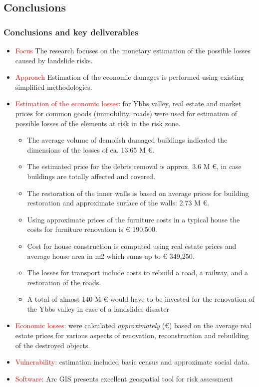 \documentclass[pdflatex,compress,9pt,
	xcolor={dvipsnames,dvipsnames,svgnames,x11names,table},
	hyperref={colorlinks = true,breaklinks = true, urlcolor = NavyBlue, breaklinks = true}]{beamer}
\begin{document}
\subsection{Conclusions}
\begin{frame}\frametitle{Conclusions and key deliverables}
\begin{itemize}
\footnotesize
	   \item \textcolor{red}{Focus} The research focuses on the monetary estimation of the possible losses caused by landslide risks. 
	   \item \textcolor{red}{Approach} Estimation of the economic damages is performed using existing simplified methodologies.
            \item \textcolor{red}{Estimation of the economic losses}: for Ybbs valley, real estate and market prices for common goods (immobility, roads) were used for estimation of possible losses of the elements at risk in the risk zone.
            \begin{itemize}
            \footnotesize
            	\item The average volume of demolish damaged buildings indicated the dimensions of the losses of ca. 13.65 M €.
		\item The estimated price for the debris removal is approx. 3.6 M €, in case buildings are totally affected and covered.
		\item The restoration of the inner walls is based on average prices for building restoration and approximate surface of the walls: 2.73 M €. 
		\item Using approximate prices of the furniture costs in a typical house the costs for furniture renovation is € 190,500.
		\item Cost for house construction is computed using real estate prices and average house area in m2 which sums up to € 349,250.
		\item The losses for transport include costs to rebuild a road, a railway, and a restoration of the roads.
		\item A total of almost 140 M € would have to be invested for the renovation of the Ybbs valley in case of a landslides disaster 
            \end{itemize}
            \item \textcolor{red}{Economic losses}: were calculated \emph{approximately} (€) based on the average real estate prices for various aspects of renovation, reconstruction and rebuilding of the destroyed objects.
            \item \textcolor{red}{Vulnerability}: estimation included basic census and approximate social data.
            \item \textcolor{red}{Software}: Arc GIS presents excellent geospatial tool for risk assessment
\end{itemize}
\end{frame}
\end{document}
